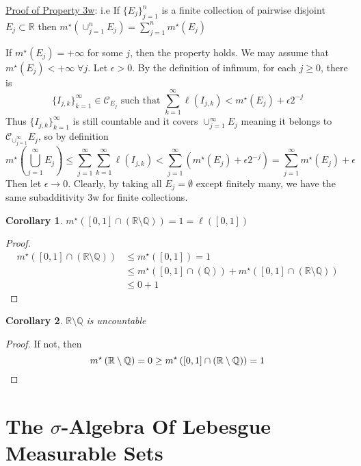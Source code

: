\documentclass[11pt]{article}
\newtheorem{corollary}{Corollary}[theorem]
\newcommand{\mstar}[1]{m^{\star}\left(#1\right)}
\newcommand{\isum}[1]{\sum_{#1=1}^{\infty}}
\begin{document}
    \underline{Proof of Property 3w}:
    i.e If $\{ E_j \}_{j=1}^{n}$ is a finite collection of pairwise disjoint $E_j \subset \mathbb{R}$ then $\mstar{\cup_{j=1}^{n} E_j} = \sum_{j=1}^{n} \mstar{E_j}$

    If $\mstar{E_j} = +\infty$ for some $j$, then the property holds.
    We may assume that $\mstar{E_j} < + \infty \; \forall j$.
    Let $\epsilon > 0$.
    By the definition of infimum, for each $j \geq 0$, there is
    \[
        \{ I_{j,k} \}_{k=1}^{\infty} \in \mathcal{C}_{E_j} \text{ such that } \isum{k} \ell (I_{j,k}) < \mstar{E_j} + \epsilon 2^{-j}
    \]
    Thus $\{ I_{j,k} \}_{k=1}^{\infty}$ is still countable and it covers $\cup_{j=1}^{\infty} E_j$ meaning it belongs to $\mathcal{C}_{\cup_{j=1}^{\infty}} E_j$, so by definition
    \[
       \mstar{\bigcup_{j=1}^{\infty} E_j} \leq \sum_{j=1}^{\infty} \isum{k} \ell (I_{j,k}) < \sum_{j=1}^{\infty} (\mstar{E_j} + \epsilon 2^{-j}) = \sum_{j=1}^{\infty} \mstar{E_j} + \epsilon
    \]
    Then let $\epsilon \rightarrow 0$.
    Clearly, by taking all $E_j = \emptyset$ except finitely many, we have the same subadditivity 3w for finite collections.

    \begin{corollary}
        $\mstar{[0,1] \cap (\mathbb{R} \setminus \mathbb{Q})} = 1 = \ell([0,1])$
    \end{corollary}
    \begin{proof}
        \begin{align*}
            \mstar{[0,1] \cap (\mathbb{R} \setminus \mathbb{Q})} &\leq \mstar{[0,1]} = 1 \\
            &\leq \mstar{[0,1] \cap (\mathbb{Q})} + \mstar{[0,1] \cap (\mathbb{R} \setminus \mathbb{Q})} \\
            &\leq 0 + 1
        \end{align*}
    \end{proof}

    \begin{corollary}
        $\mathbb{R} \setminus \mathbb{Q}$ is uncountable
    \end{corollary}
    \begin{proof}
        If not, then
        \[
            \mstar{\mathbb{R} \setminus \mathbb{Q}} = 0 \geq \mstar{[0,1] \cap (\mathbb{R} \setminus \mathbb{Q})} = 1 \qedhere
        \]
    \end{proof}

    \section{The $\sigma$-Algebra Of Lebesgue Measurable Sets}\label{sec:the-$sigma$-algebra-of-lebesgue-measurable-sets}
\end{document}
